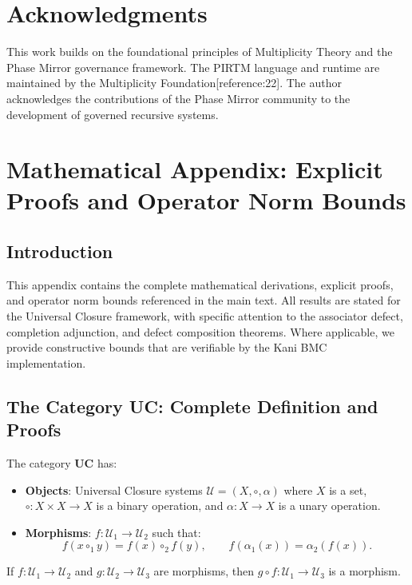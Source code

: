 \documentclass[11pt]{article}
\begin{document}
\begin{enumerate}
\section*{Acknowledgments}

This work builds on the foundational principles of Multiplicity Theory and the Phase Mirror governance framework. The PIRTM language and runtime are maintained by the Multiplicity Foundation[reference:22]. The author acknowledges the contributions of the Phase Mirror community to the development of governed recursive systems.
\newpage
\appendix
\section{Mathematical Appendix: Explicit Proofs and Operator Norm Bounds}

\subsection*{Introduction}

This appendix contains the complete mathematical derivations, explicit proofs, and operator norm bounds referenced in the main text. All results are stated for the Universal Closure framework, with specific attention to the associator defect, completion adjunction, and defect composition theorems. Where applicable, we provide constructive bounds that are verifiable by the Kani BMC implementation.

\subsection{The Category UC: Complete Definition and Proofs}

\begin{definition}[Category UC]
The category $\mathbf{UC}$ has:
\begin{itemize}
    \item \textbf{Objects}: Universal Closure systems $\mathcal{U} = (X, \circ, \alpha)$ where $X$ is a set, $\circ: X \times X \to X$ is a binary operation, and $\alpha: X \to X$ is a unary operation.
    \item \textbf{Morphisms}: $f: \mathcal{U}_1 \to \mathcal{U}_2$ such that:
    \[
    f(x \circ_1 y) = f(x) \circ_2 f(y), \qquad f(\alpha_1(x)) = \alpha_2(f(x)).
    \]
\end{itemize}
\end{definition}

\begin{lemma}
If $f: \mathcal{U}_1 \to \mathcal{U}_2$ and $g: \mathcal{U}_2 \to \mathcal{U}_3$ are morphisms, then $g \circ f: \mathcal{U}_1 \to \mathcal{U}_3$ is a morphism.
\end{lemma}


\end{enumerate}
\end{document}
